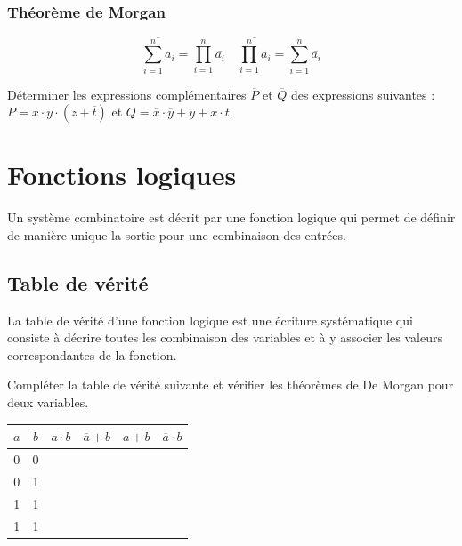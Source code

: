 \documentclass[10pt,fleqn]{article} %
\begin{document}
\subsubsection{Théorème de Morgan}
\begin{theorem}
$$
\overline{\sum\limits_{i=1}^{n} a_i} = \prod\limits_{i=1}^n \overline{a_i}
\quad
\overline{\prod\limits_{i=1}^{n} a_i} = \sum\limits_{i=1}^n \overline{a_i}
$$
\end{theorem}

\begin{exemple}
Déterminer les expressions complémentaires $\overline{P}$ et $\overline{Q}$ des expressions suivantes : 
$P = x\cdot y \cdot (z + \overline{t})$ et $Q=\overline{x}\cdot\overline{y} + y + x\cdot t$.
\end{exemple}

\section{Fonctions logiques}

Un système combinatoire est décrit par une fonction logique qui permet de définir de manière unique la sortie pour une combinaison des entrées. 

\subsection{Table de vérité}
La table de vérité d'une fonction logique est une écriture systématique qui consiste à décrire toutes les combinaison des variables et à y associer les valeurs correspondantes de la fonction. 

\begin{exemple}


Compléter la table de vérité suivante et vérifier les théorèmes de De Morgan pour deux variables.
\begin{center}
\begin{tabular}[c]{|c|c||c|c|c|c|}
\hline
$a$ & $b$ & $\overline{a\cdot b}$ & $\overline{a} + \overline{b}$ & $\overline{a+b}$ & $\overline{a}\cdot\overline{b}$ \\
\hline \hline 
0 & 0 & & & & \\ \hline
0 & 1 & & & & \\ \hline
1 & 1 & & & & \\ \hline
1 & 1 & & & & \\ \hline
\end{tabular}
\end{center}

\end{exemple}
\end{document}
